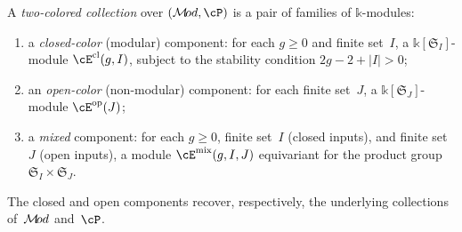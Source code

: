 \begin{definition}
\label{def:two-colored-collection}
A \emph{two-colored collection} over $(\cM\!od, \cP)$ is a pair
of families of $\mathbb{k}$-modules:
\begin{enumerate}[label=\textup{(\roman*)}]
\item a \emph{closed-color} (modular) component: for each
 $g \ge 0$ and finite set~$I$, a
 $\mathbb{k}[\mathfrak{S}_I]$-module
 $\cE^{\mathrm{cl}}(g,I)$, subject to the stability
 condition $2g - 2 + |I| > 0$;
\item an \emph{open-color} (non-modular) component: for each
 finite set~$J$, a
 $\mathbb{k}[\mathfrak{S}_J]$-module
 $\cE^{\mathrm{op}}(J)$;
\item a \emph{mixed} component: for each $g \ge 0$, finite
 set~$I$ (closed inputs), and finite set~$J$ (open inputs),
 a module $\cE^{\mathrm{mix}}(g, I, J)$ equivariant for the
 product group
 $\mathfrak{S}_I \times \mathfrak{S}_J$.
\end{enumerate}
The closed and open components recover, respectively, the
underlying collections of~$\mathcal{M}\!od$ and~$\cP$.
\end{definition}

